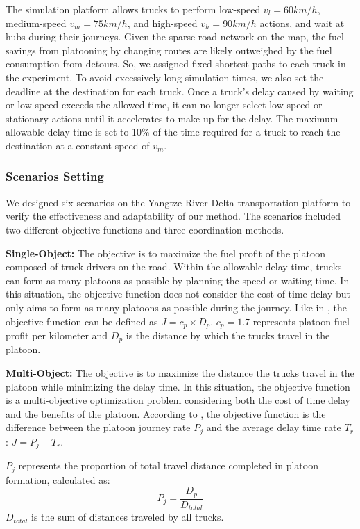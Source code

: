 \documentclass[lettersize,journal]{IEEEtran}
\begin{document}
The simulation platform allows trucks to perform low-speed $v_l=60 km/h$, medium-speed $v_m=75 km/h$, and high-speed $v_h=90 km/h$ actions, and wait at hubs during their journeys. Given the sparse road network on the map, the fuel savings from platooning by changing routes are likely outweighed by the fuel consumption from detours. So, we assigned fixed shortest paths to each truck in the experiment. To avoid excessively long simulation times, we also set the deadline at the destination for each truck. Once a truck's delay caused by waiting or low speed exceeds the allowed time, it can no longer select low-speed or stationary actions until it accelerates to make up for the delay.
The maximum allowable delay time is set to 10\% of the time required for a truck to reach the destination at a constant speed of $v_m$.



\subsubsection{Scenarios Setting}
We designed six scenarios on the Yangtze River Delta transportation platform to verify the effectiveness and adaptability of our method. The scenarios included two different objective functions and three coordination methods.

\textbf{Single-Object:} The objective is to maximize the fuel profit of the platoon composed of truck drivers on the road. 
Within the allowable delay time, trucks can form as many platoons as possible by planning the speed or waiting time.
In this situation, the objective function does not consider the cost of time delay but only aims to form as many platoons as possible during the journey.
Like in \cite{wei2023multi}, the objective function can be defined as $J= c_p \times D_{p}$. 
$c_p=1.7$ represents platoon fuel profit per kilometer and $D_{p}$ is the distance by which the trucks travel in the platoon.

\textbf{Multi-Object:} The objective is to maximize the distance the trucks travel in the platoon while minimizing the delay time.
In this situation, the objective function is a multi-objective optimization problem considering both the cost of time delay and the benefits of the platoon.
According to \cite{wei2024multi}, the objective function is the difference between the platoon journey rate $P_j$ and the average delay time rate $T_r$: $J=P_j - T_r$.

$P_j$ represents the proportion of total travel distance completed in platoon formation, calculated as:
\begin{equation}
    P_j = \frac{D_p}{D_{total}}
\end{equation}
$D_{total}$ is the sum of distances traveled by all trucks.
\end{document}
